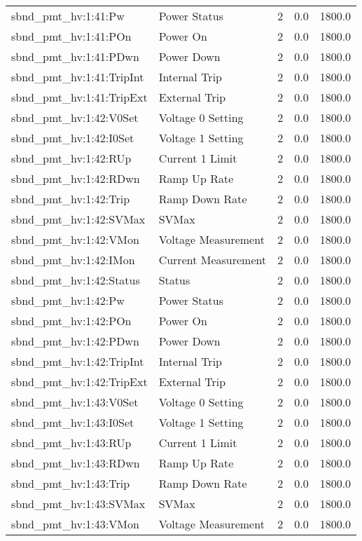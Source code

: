 \begin{center}
\begin{longtable}{l | l l l l }
sbnd\_pmt\_hv:1:41:Pw & Power Status & 2 & 0.0 & 1800.0\\ 
sbnd\_pmt\_hv:1:41:POn & Power On & 2 & 0.0 & 1800.0\\ 
sbnd\_pmt\_hv:1:41:PDwn & Power Down & 2 & 0.0 & 1800.0\\ 
sbnd\_pmt\_hv:1:41:TripInt & Internal Trip & 2 & 0.0 & 1800.0\\ 
sbnd\_pmt\_hv:1:41:TripExt & External Trip & 2 & 0.0 & 1800.0\\ 
sbnd\_pmt\_hv:1:42:V0Set & Voltage 0 Setting & 2 & 0.0 & 1800.0\\ 
sbnd\_pmt\_hv:1:42:I0Set & Voltage 1 Setting & 2 & 0.0 & 1800.0\\ 
sbnd\_pmt\_hv:1:42:RUp & Current 1 Limit & 2 & 0.0 & 1800.0\\ 
sbnd\_pmt\_hv:1:42:RDwn & Ramp Up Rate & 2 & 0.0 & 1800.0\\ 
sbnd\_pmt\_hv:1:42:Trip & Ramp Down Rate & 2 & 0.0 & 1800.0\\ 
sbnd\_pmt\_hv:1:42:SVMax & SVMax & 2 & 0.0 & 1800.0\\ 
sbnd\_pmt\_hv:1:42:VMon & Voltage Measurement & 2 & 0.0 & 1800.0\\ 
sbnd\_pmt\_hv:1:42:IMon & Current Measurement & 2 & 0.0 & 1800.0\\ 
sbnd\_pmt\_hv:1:42:Status & Status & 2 & 0.0 & 1800.0\\ 
sbnd\_pmt\_hv:1:42:Pw & Power Status & 2 & 0.0 & 1800.0\\ 
sbnd\_pmt\_hv:1:42:POn & Power On & 2 & 0.0 & 1800.0\\ 
sbnd\_pmt\_hv:1:42:PDwn & Power Down & 2 & 0.0 & 1800.0\\ 
sbnd\_pmt\_hv:1:42:TripInt & Internal Trip & 2 & 0.0 & 1800.0\\ 
sbnd\_pmt\_hv:1:42:TripExt & External Trip & 2 & 0.0 & 1800.0\\ 
sbnd\_pmt\_hv:1:43:V0Set & Voltage 0 Setting & 2 & 0.0 & 1800.0\\ 
sbnd\_pmt\_hv:1:43:I0Set & Voltage 1 Setting & 2 & 0.0 & 1800.0\\ 
sbnd\_pmt\_hv:1:43:RUp & Current 1 Limit & 2 & 0.0 & 1800.0\\ 
sbnd\_pmt\_hv:1:43:RDwn & Ramp Up Rate & 2 & 0.0 & 1800.0\\ 
sbnd\_pmt\_hv:1:43:Trip & Ramp Down Rate & 2 & 0.0 & 1800.0\\ 
sbnd\_pmt\_hv:1:43:SVMax & SVMax & 2 & 0.0 & 1800.0\\ 
sbnd\_pmt\_hv:1:43:VMon & Voltage Measurement & 2 & 0.0 & 1800.0\\ 

\end{longtable}
\end{center}

